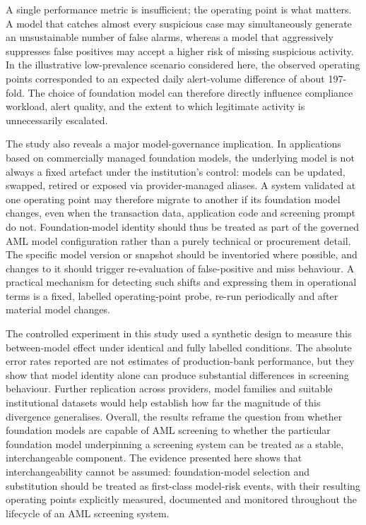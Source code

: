 \documentclass[pdflatex,sn-basic,Numbered]{sn-jnl}
\begin{document}
A single performance metric is insufficient; the operating point is what matters. A model that catches almost every suspicious case may simultaneously generate an unsustainable number of false alarms, whereas a model that aggressively suppresses false positives may accept a higher risk of missing suspicious activity. In the illustrative low-prevalence scenario considered here, the observed operating points corresponded to an expected daily alert-volume difference of about 197-fold. The choice of foundation model can therefore directly influence compliance workload, alert quality, and the extent to which legitimate activity is unnecessarily escalated.

The study also reveals a major model-governance implication. In applications based on commercially managed foundation models, the underlying model is not always a fixed artefact under the institution's control: models can be updated, swapped, retired or exposed via provider-managed aliases. A system validated at one operating point may therefore migrate to another if its foundation model changes, even when the transaction data, application code and screening prompt do not. Foundation-model identity should thus be treated as part of the governed AML model configuration rather than a purely technical or procurement detail. The specific model version or snapshot should be inventoried where possible, and changes to it should trigger re-evaluation of false-positive and miss behaviour. A practical mechanism for detecting such shifts and expressing them in operational terms is a fixed, labelled operating-point probe, re-run periodically and after material model changes.

The controlled experiment in this study used a synthetic design to measure this between-model effect under identical and fully labelled conditions. The absolute error rates reported are not estimates of production-bank performance, but they show that model identity alone can produce substantial differences in screening behaviour. Further replication across providers, model families and suitable institutional datasets would help establish how far the magnitude of this divergence generalises. Overall, the results reframe the question from whether foundation models are capable of AML screening to whether the particular foundation model underpinning a screening system can be treated as a stable, interchangeable component. The evidence presented here shows that interchangeability cannot be assumed: foundation-model selection and substitution should be treated as first-class model-risk events, with their resulting operating points explicitly measured, documented and monitored throughout the lifecycle of an AML screening system.
\end{document}
